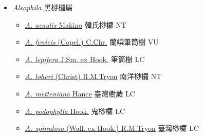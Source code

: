
  \begin{itemize}
 \item[] \textit{Alsophila} 黑桫欏屬
                    
  \begin{itemize}
        \item[] \href{http://www.theplantlist.org/tpl1.1/search?q=Alsophila+acaulis}{\textit{A. acaulis} Makino}     韓氏桫欏 NT
        \item[] \href{http://www.theplantlist.org/tpl1.1/search?q=Alsophila+fenicis}{\textit{A. fenicis} (Copel.) C.Chr.}     蘭嶼筆筒樹 VU
        \item[] \href{http://www.theplantlist.org/tpl1.1/search?q=Alsophila+lepifera}{\textit{A. lepifera} J.Sm. ex Hook.}     筆筒樹 LC
        \item[] \href{http://www.theplantlist.org/tpl1.1/search?q=Alsophila+loheri}{\textit{A. loheri} (Christ) R.M.Tryon}     南洋桫欏 NT
        \item[] \href{http://www.theplantlist.org/tpl1.1/search?q=Alsophila+metteniana}{\textit{A. metteniana} Hance}     臺灣樹蕨 LC
        \item[] \href{http://www.theplantlist.org/tpl1.1/search?q=Alsophila+podophylla}{\textit{A. podophylla} Hook.}     鬼桫欏 LC
        \item[] \href{http://www.theplantlist.org/tpl1.1/search?q=Alsophila+spinulosa}{\textit{A. spinulosa} (Wall. ex Hook.) R.M.Tryon}     臺灣桫欏 LC
  \end{itemize}
  \end{itemize}
